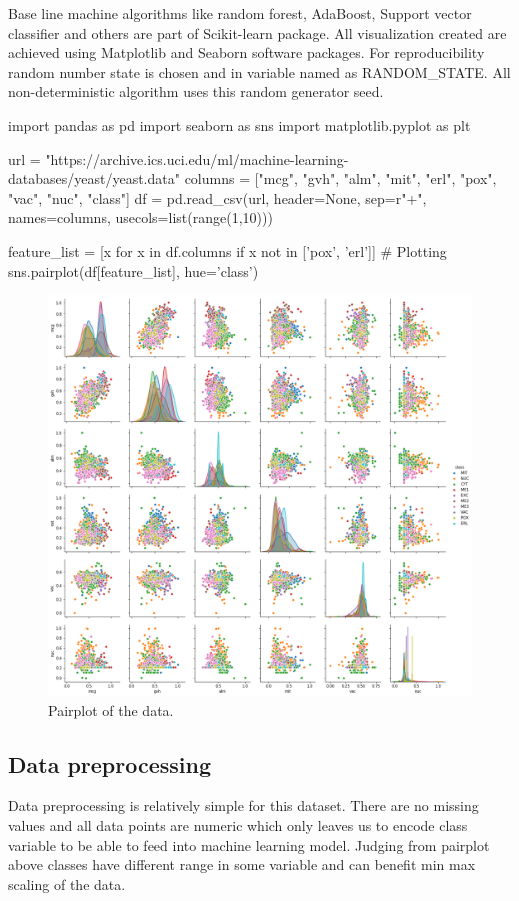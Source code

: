 \documentclass[12pt]{article}
\begin{document}
Base line machine algorithms like random forest, AdaBoost, Support vector classifier and others are part of Scikit-learn \cite{scikit-learn} package. All visualization created are achieved using Matplotlib \cite{matplotlib} and Seaborn \cite{seaborn} software packages. For reproducibility random number state is chosen and in variable named as RANDOM\_STATE. All non-deterministic algorithm uses this random generator seed.

\begin{python}
import pandas as pd
import seaborn as sns
import matplotlib.pyplot as plt

url = "https://archive.ics.uci.edu/ml/machine-learning-databases/yeast/yeast.data"
columns = ["mcg", "gvh", "alm", "mit", "erl", "pox", "vac", "nuc", "class"]
df = pd.read_csv(url, header=None, sep=r"\s+", names=columns, usecols=list(range(1,10)))

feature_list = [x for x in df.columns if x not in ['pox', 'erl']]
# Plotting
sns.pairplot(df[feature_list], hue='class')
\end{python}

\begin{figure}[H] \label{fig:pairplot}
    \centering
    \includegraphics[width=\textwidth]{img/pairplot.png}
    \caption{Pairplot of the data.}
\end{figure}

\subsection{Data preprocessing} \label{subsec:preprocess}
Data preprocessing is relatively simple for this dataset. There are no missing values and all data points are numeric which only leaves us to encode class variable to be able to feed into machine learning model. Judging from pairplot above classes have different range in some variable and can benefit min max scaling of the data. 
\end{document}

